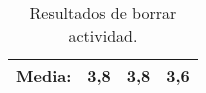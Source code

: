 \begin{table}[H]
{\begin{tabular}{c|ccc|}
            \multicolumn{1}{|c|}{\textbf{Media:}}    & \multicolumn{1}{c|}{\textbf{3,8}}                                                                                                                                            & \multicolumn{1}{c|}{\textbf{3,8}}                                                                                                                                                                     & \textbf{3,6}                                                                                                                                                                                                         \\ \hline
        \end{tabular}
    }
    \caption{Resultados de borrar actividad.}
    \label{tab:resultdadosBorrar}
\end{table}

